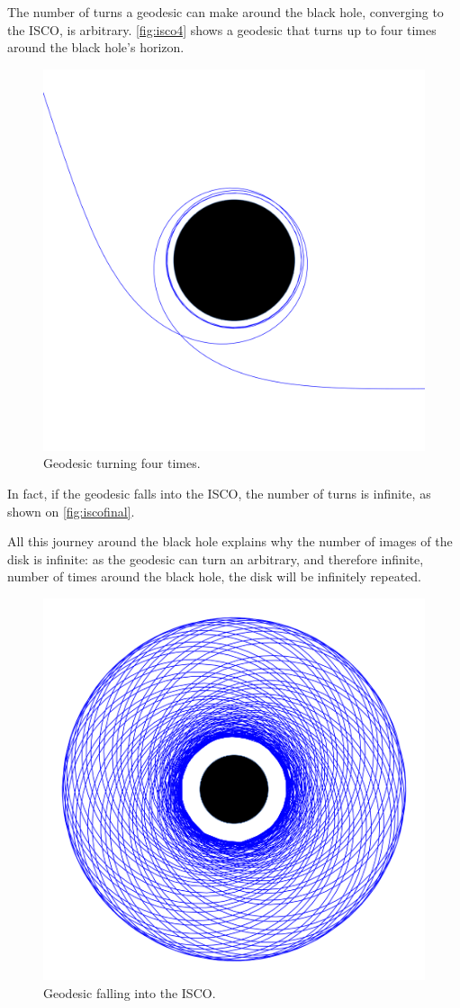 The number of turns a geodesic can make around the black hole, converging to the \ac{ISCO}, is arbitrary. \autoref{fig:isco4} shows a geodesic that turns up to four times around the black hole's horizon.
	
\begin{figure}[bth]
	\myfloatalign
	\includegraphics[width=.4\linewidth]{gfx/isco4}
	\caption[Geodesic turning four times]{Geodesic turning four times.}
	\label{fig:isco4}
\end{figure}

In fact, if the geodesic falls into the \ac{ISCO}, the number of turns is infinite, as shown on \autoref{fig:iscofinal}.

All this journey around the black hole explains why the number of images of the disk is infinite: as the geodesic can turn an arbitrary, and therefore infinite, number of times around the black hole, the disk will be infinitely repeated.

\begin{figure}[bth]
	\myfloatalign
	\includegraphics[width=.7\linewidth]{gfx/iscofinal}
	\caption[Geodesic falling into the ISCO]{Geodesic falling into the \ac{ISCO}.}
	\label{fig:iscofinal}
\end{figure}